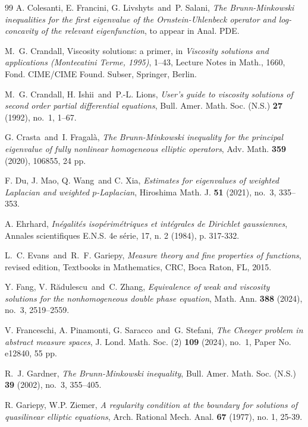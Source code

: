 \documentclass[12pt]{amsart}
\newcommand{\1}{\mathbf 1}
\begin{document}
\begin{thebibliography}{99}
A. Colesanti, E. Francini, G. Livshyts\ and\ P. Salani, {\em The Brunn-Minkowski inequalities for the first eigenvalue of the Ornstein-Uhlenbeck operator and log-concavity of the relevant eigenfunction}, {   to appear in Anal. PDE}.

M.~G. Crandall, Viscosity solutions: a primer, in {\it Viscosity solutions and applications (Montecatini Terme, 1995)}, 1--43, Lecture Notes in Math., 1660, Fond. CIME/CIME Found. Subser, Springer, Berlin.

M.~G. Crandall, H. Ishii\ and\ P.-L. Lions, {\em User's guide to viscosity solutions of second order partial differential equations}, Bull. Amer. Math. Soc. (N.S.) {\bf 27} (1992), no.~1, 1--67.

G. Crasta\ and\ I. Fragal\`a, {\em The Brunn-Minkowski inequality for the principal eigenvalue of fully nonlinear homogeneous elliptic operators}, Adv. Math. {\bf 359} (2020), 106855, 24 pp.

F. Du, J. Mao, Q. Wang\ and C. Xia, {\em Estimates for eigenvalues of weighted Laplacian and weighted $p$-Laplacian}, Hiroshima Math. J. {\bf 51} (2021), no.~3, 335--353.

 A. Ehrhard, {\it In\'egalit\'es isop\'erim\'etriques et int\'egrales de Dirichlet gaussiennes},
Annales scientifiques E.N.S. 4e s\'erie, 17, n. 2 (1984), p. 317-332.

L.~C. Evans\ and\ R.~F. Gariepy, {\it Measure theory and fine properties of functions}, revised edition, Textbooks in Mathematics, CRC, Boca Raton, FL, 2015.

Y. Fang, V. R\u{a}dulescu\ and\ C. Zhang, {\em Equivalence of weak and viscosity solutions for the nonhomogeneous double phase equation}, Math. Ann. {\bf 388} (2024), no.~3, 2519--2559.

V. Franceschi, A. Pinamonti, G. Saracco\ and\ G. Stefani, {\em The Cheeger problem in abstract measure spaces}, J. Lond. Math. Soc. (2) {\bf 109} (2024), no.~1, Paper No. e12840, 55 pp.

R.~J. Gardner, {\em The Brunn-Minkowski inequality}, Bull. Amer. Math. Soc. (N.S.) {\bf 39} (2002), no.~3, 355--405.

 R. Gariepy, W.P. Ziemer, {\em A regularity condition at the boundary for solutions of quasilinear elliptic equations}, Arch. Rational Mech. Anal. {\bf 67} (1977), no. 1, 25-39.


\end{thebibliography}
\end{document}
